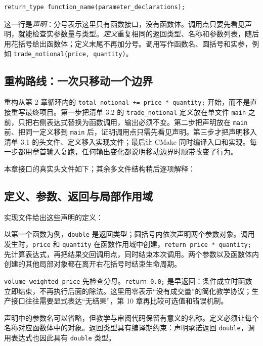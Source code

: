 \begin{lstlisting}
return_type function_name(parameter_declarations);
\end{lstlisting}

这一行是\emph{声明}：分号表示这里只有函数接口，没有函数体。调用点只要先看见声明，就能检查实参数量与类型。\emph{定义}重复相同的返回类型、名称和参数列表，随后用花括号给出函数体；定义末尾不再加分号。调用写作函数名、圆括号和实参，例如 \texttt{trade\_notional(price, quantity)}。

\subsection{重构路线：一次只移动一个边界}

重构从第 2 章循环内的 \texttt{total\_notional += price * quantity;} 开始，而不是直接重写最终项目。第一步把清单 3.2 的 \texttt{trade\_notional} 定义放在单文件 \texttt{main} 之前，只把右侧表达式替换为函数调用，输出必须不变。第二步把声明放在 \texttt{main} 前、把同一定义移到 \texttt{main} 后，证明调用点只需先看见声明。第三步才把声明移入清单 3.1 的头文件、定义移入实现文件；最后让 CMake 同时编译入口和实现。每一步都用章首输入复跑，任何输出变化都说明移动边界时顺带改变了行为。

本章接口的真实头文件如下；其余多文件结构稍后逐项解释：



\subsection{定义、参数、返回与局部作用域}

实现文件给出这些声明的定义：



以第一个函数为例，\texttt{double} 是返回类型；圆括号内依次声明两个参数对象。调用发生时，\texttt{price} 和 \texttt{quantity} 在函数作用域中创建，\texttt{return price * quantity;} 先计算表达式，再把结果交回调用点，同时结束本次调用。两个参数以及函数体内创建的其他局部对象都在离开右花括号时结束生命周期。

\texttt{volume\_weighted\_price} 先检查分母。\texttt{return 0.0;} 是早返回：条件成立时函数立即结束，不再执行后面的除法。这里用零表示“没有成交量”的简化教学协议；生产接口往往需要显式表达“无结果”，第 10 章再比较可选值和错误机制。

声明中的参数名可以省略，但教学与审阅代码保留有意义的名称。定义必须让每个名称对应函数体中的对象。返回类型具有编译期约束：声明承诺返回 \texttt{double}，调用表达式也因此具有 \texttt{double} 类型。

